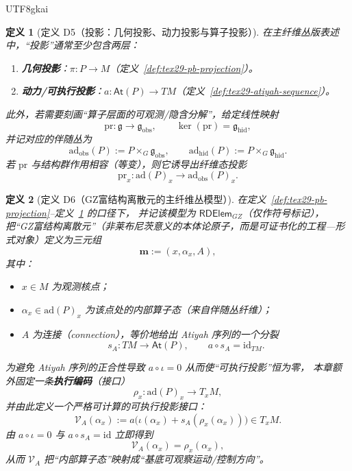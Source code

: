 \documentclass[12pt]{article}
\newtheorem{definition}{定义}[section]
\newcommand{\GZMonFull}{\texorpdfstring{GZ富结构离散元}{GZ富结构离散元}}
\newcommand{\GZMon}{\texorpdfstring{GZ富结构离散元}{GZ富结构离散元}}
\begin{document}
\begin{CJK*}{UTF8}{gkai}
\begin{definition}[定义 D5（投影：几何投影、动力投影与算子投影）]
\label{def:tex29-projection-multi}
在主纤维丛版表述中，“投影”通常至少包含两层：
\begin{enumerate}
  \item \textbf{几何投影}：$\pi:P\to M$（定义~\ref{def:tex29-pb-projection}）。
  \item \textbf{动力/可执行投影}：$a:\mathsf{At}(P)\to TM$（定义~\ref{def:tex29-atiyah-sequence}）。
\end{enumerate}
此外，若需要刻画“算子层面的可观测/隐含分解”，给定线性映射
\[
  \mathrm{pr}:\mathfrak{g}\to\mathfrak{g}_{\mathrm{obs}},
  \qquad
  \ker(\mathrm{pr})=\mathfrak{g}_{\mathrm{hid}},
\]
并记对应的伴随丛为
\[
  \mathrm{ad}_{\mathrm{obs}}(P):=P\times_G\mathfrak{g}_{\mathrm{obs}},
  \qquad
  \mathrm{ad}_{\mathrm{hid}}(P):=P\times_G\mathfrak{g}_{\mathrm{hid}}.
\]
若 $\mathrm{pr}$ 与结构群作用相容（等变），则它诱导出纤维态投影
\[
  \mathrm{pr}_x:\mathrm{ad}(P)_x\to \mathrm{ad}_{\mathrm{obs}}(P)_x.
\]
\end{definition}

\begin{definition}[定义 D6（\GZMonFull{}的主纤维丛模型）]
\label{def:tex29-monad-gz-atiyah}
在定义~\ref{def:tex29-pb-projection}--定义~\ref{def:tex29-projection-multi} 的口径下，
并记该模型为 $\mathsf{RDElem}_{GZ}$（仅作符号标记），
把“\GZMon{}”（非莱布尼茨意义的本体论原子，而是可证书化的工程—形式对象）定义为三元组
\[
  \mathbf{m}:=(x,\alpha_x,A),
\]
其中：
\begin{itemize}
  \item $x\in M$ 为观测核点；
  \item $\alpha_x\in \mathrm{ad}(P)_x$ 为该点处的内部算子态（来自伴随丛纤维）；
  \item $A$ 为连接（connection），等价地给出 Atiyah 序列的一个分裂
  \[
    s_A:TM\to\mathsf{At}(P),\qquad a\circ s_A=\mathrm{id}_{TM}.
  \]
\end{itemize}
为避免 Atiyah 序列的正合性导致 $a\circ\iota=0$ 从而使“可执行投影”恒为零，
本章额外固定一条\textbf{执行编码}（接口）
\[
  \rho_x:\mathrm{ad}(P)_x\to T_xM,
\]
并由此定义一个严格可计算的可执行投影接口：
\[
  \mathcal{V}_A(\alpha_x)
  :=a\bigl(\iota(\alpha_x)+s_A(\rho_x(\alpha_x))\bigr)
  \in T_xM.
\]
由 $a\circ\iota=0$ 与 $a\circ s_A=\mathrm{id}$ 立即得到
\[
  \mathcal{V}_A(\alpha_x)=\rho_x(\alpha_x),
\]
从而 $\mathcal{V}_A$ 把“内部算子态”映射成“基底可观察运动/控制方向”。
\end{definition}


\end{CJK*}
\end{document}
